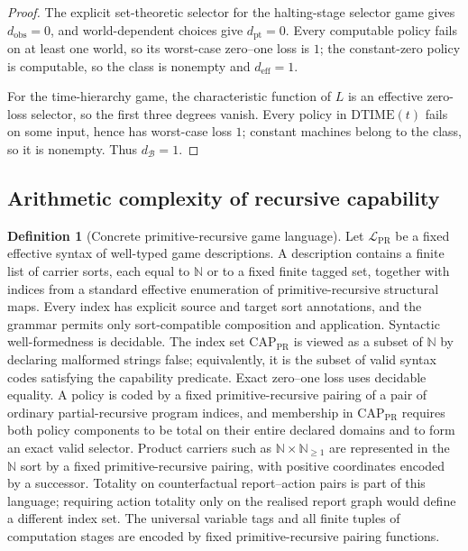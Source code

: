\documentclass[11pt]{article}
\theoremstyle{plain}
\theoremstyle{definition}
\newtheorem{definition}[theorem]{Definition}
\theoremstyle{remark}
\newcommand{\N}{\mathbb{N}}
\begin{document}
\begin{proof}
The explicit set-theoretic selector for the halting-stage selector game gives
$d_{\mathrm{obs}}=0$, and world-dependent choices give $d_{\mathrm{pt}}=0$.
Every computable policy fails on at least one world, so its worst-case zero--one
loss is $1$; the constant-zero policy is computable, so the class is nonempty and
$d_{\mathrm{eff}}=1$.

For the time-hierarchy game, the characteristic function of $L$ is an effective
zero-loss selector, so the first three degrees vanish. Every policy in
$\mathrm{DTIME}(t)$ fails on some input, hence has worst-case loss $1$; constant
machines belong to the class, so it is nonempty. Thus $d_{\mathcal B}=1$.
\end{proof}

\subsection{Arithmetic complexity of recursive capability}

\begin{definition}[Concrete primitive-recursive game language]\label{def:AHdef}
Let $\mathcal L_{\mathrm{PR}}$ be a fixed effective syntax of well-typed game
descriptions. A description contains a finite list of carrier sorts, each equal
to $\N$ or to a fixed finite tagged set, together with indices from a standard
effective enumeration of primitive-recursive structural maps. Every index has
explicit source and target sort annotations, and the grammar permits only
sort-compatible composition and application. Syntactic well-formedness is
decidable. The index set $\mathrm{CAP}_{\mathrm{PR}}$ is viewed as a subset of
$\N$ by declaring malformed strings false; equivalently, it is the subset of
valid syntax codes satisfying the capability predicate. Exact zero--one loss uses
decidable equality. A policy is coded by a fixed primitive-recursive pairing of a
pair of ordinary partial-recursive program indices, and membership in
$\mathrm{CAP}_{\mathrm{PR}}$ requires both policy components to be total on their
entire declared domains and to form an exact valid selector. Product carriers
such as $\N\times\N_{\ge1}$ are represented in the $\N$ sort by a fixed
primitive-recursive pairing, with positive coordinates encoded by a successor.
Totality on counterfactual report--action pairs is part of this language;
requiring action totality only on the realised report graph would define a
different index set. The universal variable tags and all finite tuples of
computation stages are encoded by fixed primitive-recursive pairing functions.
\end{definition}
\end{document}
